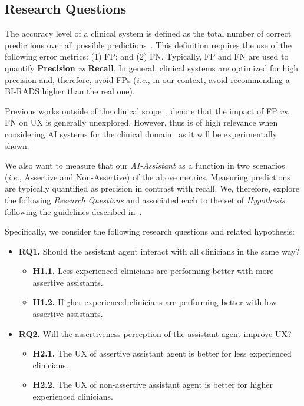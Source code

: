 \subsection{Research Questions}
\label{sec:sec00305}

The accuracy level of a clinical system is defined as the total number of correct predictions over all possible predictions~\cite{seref2019performance}.
This definition requires the use of the following error metrics:
(1) FP; and
(2) FN.
Typically, FP and FN are used to quantify {\bf Precision} {\it vs} {\bf Recall}.
In general, clinical systems are optimized for high precision and, therefore, avoid FPs ({\it i.e.}, in our context, avoid recommending a BI-RADS higher than the real one).

Previous works outside of the clinical scope~\cite{Kocielnik:2019:YAI:3290605.3300641, Dove:2017:UDI:3025453.3025739}, denote that the impact of FP {\it vs.} FN on UX is generally unexplored.
However, thus is of high relevance when considering AI systems for the clinical domain~\cite{boughey2016identification, dialani2015role} as it will be experimentally shown.

We also want to measure that our \textit{AI-Assistant} as a function in two scenarios ({\it i.e.}, Assertive and Non-Assertive) of the above metrics.
Measuring predictions are typically quantified as precision in contrast with recall.
We, therefore, explore the following {\it Research Questions} and associated each to the set of {\it Hypothesis} following the guidelines described in~\cite{10.1145/3290605.3300233, Kocielnik:2019:YAI:3290605.3300641}.

\hfill

\noindent
Specifically, we consider the following research questions and related hypothesis:

\begin{itemize}
\item {\bf RQ1.} Should the assistant agent interact with all clinicians in the same way?
\begin{itemize}
\item {\bf H1.1.} Less experienced clinicians are performing better with more assertive assistants.
\item {\bf H1.2.} Higher experienced clinicians are performing better with low assertive assistants.
\end{itemize}
\item {\bf RQ2.} Will the assertiveness perception of the assistant agent improve UX?
\begin{itemize}
\item {\bf H2.1.} The UX of assertive assistant agent is better for less experienced clinicians.
\item {\bf H2.2.} The UX of non-assertive assistant agent is better for higher experienced clinicians.
\end{itemize}
\end{itemize}


